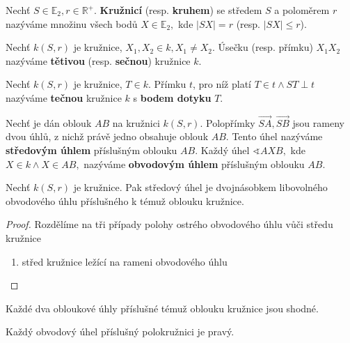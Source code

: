 \begin{definition}
  Nechť $S \in \mathbb E_2, r \in \mathbb R^+.$  \textbf{Kružnicí} (resp. \textbf{kruhem}) se středem $S$ a poloměrem $r$ nazýváme množinu všech bodů $X\in \mathbb E_2, $ kde $|SX|=r$ (resp. $|SX|\leq r$).
\end{definition}

\begin{definition}
  Nechť $k(S,r)$ je kružnice, $X_1, X_2 \in k, X_1\ne X_2.$ Úsečku (resp. přímku) $X_1X_2$ nazýváme \textbf{tětivou} (resp. \textbf{sečnou}) kružnice $k$.
\end{definition}


\begin{definition}
  Nechť $k(S,r)$ je kružnice, $T\in k$. Přímku $t$, pro níž platí $T\in t \land ST \perp t$ nazýváme \textbf{tečnou} kružnice $k$ s \textbf{bodem dotyku} $T$.
\end{definition}

\begin{definition}
  Nechť je dán oblouk $AB$ na kružnici $k(S,r).$ Polopřímky $\overrightarrow{SA}, \overrightarrow{SB}$ jsou rameny dvou úhlů, z nichž právě jedno obsahuje oblouk $AB$. Tento úhel nazýváme \textbf{středovým úhlem} příslušným oblouku $AB$. Každý úhel $\sphericalangle AXB,$ kde $X\in k \land X\in AB,$ nazýváme \textbf{obvodovým úhlem} příslušným oblouku $AB$.
\end{definition}

\begin{veta}
  Nechť $k(S,r)$ je kružnice. Pak středový úhel je dvojnásobkem libovolného obvodového úhlu příslušného k témuž oblouku kružnice.
\end{veta}


\begin{proof}
  Rozdělíme na tři případy polohy ostrého obvodového úhlu vůči středu kružnice
  \begin{enumerate}
    \item střed kružnice ležící na rameni obvodového úhlu
  \end{enumerate}
\end{proof}


\begin{veta}
  Každé dva obloukové úhly příslušné témuž oblouku kružnice jsou shodné.
\end{veta}


\begin{veta}[Thaletova]
  Každý obvodový úhel příslušný polokružnici je pravý.
\end{veta}

